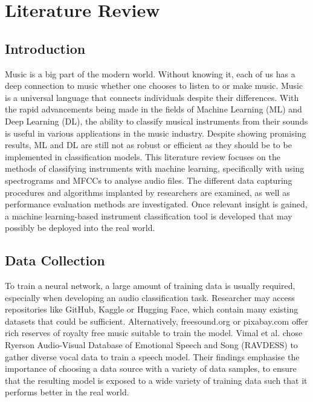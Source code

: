 \documentclass[class=report,11pt,crop=false]{standalone}
\begin{document}
\ifstandalone
\tableofcontents
\fi
\section{Literature Review \label{ch:literature}}

\subsection{Introduction}

Music is a big part of the modern world. Without knowing it, each of us has a deep connection to music whether one chooses to listen to or make music. Music is a universal language that connects individuals despite their differences. With the rapid advancements being made in the fields of Machine Learning (ML) and Deep Learning (DL), the ability to classify musical instruments from their sounds is useful in various applications in the music industry. Despite showing promising results, ML and DL are still not as robust or efficient as they should be to be implemented in classification models. This literature review focuses on the methods of classifying instruments with machine learning, specifically with using spectrograms and MFCCs to analyse audio files. The different data capturing procedures and algorithms implanted by researchers are examined, as well as performance evaluation methods are investigated. Once relevant insight is gained, a machine learning-based instrument classification tool is developed that may possibly be deployed into the real world. 

\subsection{Data Collection}

To train a neural network, a large amount of training data is usually required, especially when developing an audio classification task. Researcher may access repositories like GitHub, Kaggle or Hugging Face, which contain many existing datasets that could be sufficient. Alternatively, freesound.org or pixabay.com offer rich reserves of royalty free music suitable to train the model. 
Vimal et al. \cite{Vimal_2021} chose Ryerson Audio-Visual Database of Emotional Speech and Song (RAVDESS) to gather diverse vocal data to train a speech model. Their findings emphasise the importance of choosing a data source with a variety of data samples, to ensure that the resulting model is exposed to a wide variety of training data such that it performs better in the real world. 
\end{document}
